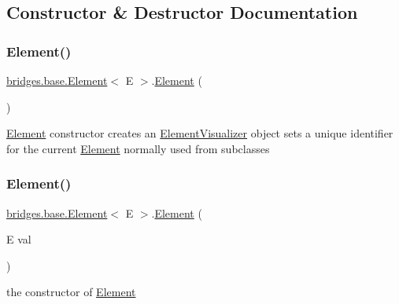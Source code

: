 \subsection{Constructor \& Destructor Documentation}
\mbox{\label{classbridges_1_1base_1_1_element_aa5fc5728f2ed4b041118a77409442390}} 
\subsubsection{\texorpdfstring{Element()}{Element()}\hspace{0.1cm}{\footnotesize\ttfamily [1/4]}}
{\footnotesize\ttfamily \mbox{\hyperlink{classbridges_1_1base_1_1_element}{bridges.\+base.\+Element}}$<$ E $>$.\mbox{\hyperlink{classbridges_1_1base_1_1_element}{Element}} (\begin{DoxyParamCaption}{ }\end{DoxyParamCaption})}

\mbox{\hyperlink{classbridges_1_1base_1_1_element}{Element}} constructor creates an \mbox{\hyperlink{classbridges_1_1base_1_1_element_visualizer}{Element\+Visualizer}} object sets a unique identifier for the current \mbox{\hyperlink{classbridges_1_1base_1_1_element}{Element}} normally used from subclasses \mbox{\label{classbridges_1_1base_1_1_element_a6cb9b3b85b923602aad5c1be6696d825}} 
\subsubsection{\texorpdfstring{Element()}{Element()}\hspace{0.1cm}{\footnotesize\ttfamily [2/4]}}
{\footnotesize\ttfamily \mbox{\hyperlink{classbridges_1_1base_1_1_element}{bridges.\+base.\+Element}}$<$ E $>$.\mbox{\hyperlink{classbridges_1_1base_1_1_element}{Element}} (\begin{DoxyParamCaption}\item[{E}]{val }\end{DoxyParamCaption})}

the constructor of \mbox{\hyperlink{classbridges_1_1base_1_1_element}{Element}}


